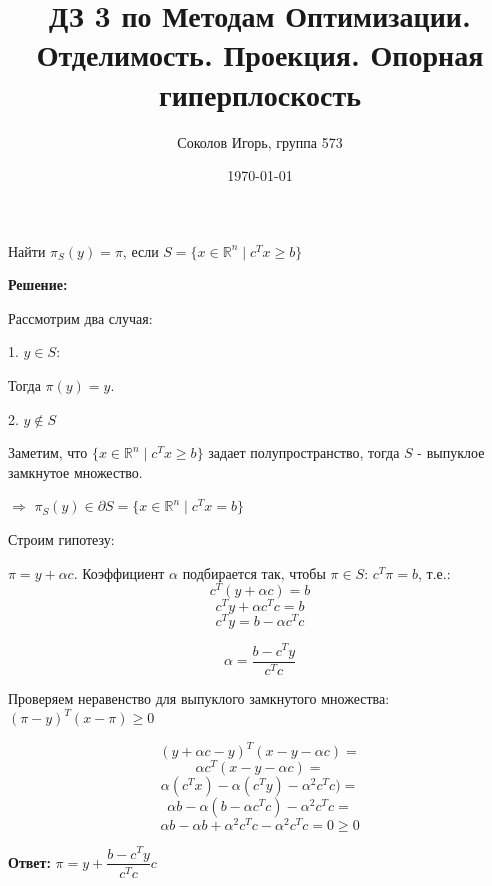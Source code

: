 \documentclass[a4paper,12pt]{article}
\author{Соколов Игорь, группа 573}
\title{ДЗ 3 по Методам Оптимизации. \newline Отделимость. Проекция. Опорная гиперплоскость}
\date{\today}
\begin{document}

\maketitle



\section{}

Найти $\pi_S (y) = \pi$, если $S = \{x \in \mathbb{R}^n \mid c^T x \ge b \}$

\vspace{\baselineskip}

\textbf{Решение:}

\vspace{\baselineskip}

Рассмотрим два случая:

1. $y \in S$:

Тогда $\pi(y) = y$.

\vspace{\baselineskip}

2. $y \notin S$

Заметим, что $\{x \in \mathbb{R}^n \mid c^T x \ge b \}$ задает полупространство, тогда $S$ - выпуклое замкнутое множество.

$\Rightarrow$ $\pi_S(y) \in \partial S = \{x \in \mathbb{R}^n \mid c^T x = b \}$

\vspace{\baselineskip}

Строим гипотезу: 

$\pi = y + \alpha c$. Коэффициент $\alpha$ подбирается так, чтобы $\pi \in S$: $c^T \pi = b$, т.е.: $$c^T (y + \alpha c) = b$$
 $$c^Ty + \alpha c^T c = b$$
 $$c^Ty = b - \alpha c^T c$$
 
 $$\alpha = \frac{b - c^Ty}{c^Tc}$$
 
Проверяем неравенство для выпуклого замкнутого множества: $(\pi - y)^T(x - \pi) \ge 0$


 $$(y + \alpha c - y)^T(x - y - \alpha c) = $$
 $$ \alpha c^T(x - y - \alpha c) = $$
 $$ \alpha (c^Tx) - \alpha (c^T y) - \alpha^2 c^Tc) = $$
 $$ \alpha b - \alpha (b - \alpha c^T c) - \alpha^2 c^Tc = $$
 $$ \alpha b - \alpha b + \alpha^2 c^T c - \alpha^2 c^Tc = 0 \ge 0$$


\textbf{Ответ:} $\pi = y + \dfrac{b - c^Ty}{c^Tc}c$

\section{}
\end{document}
